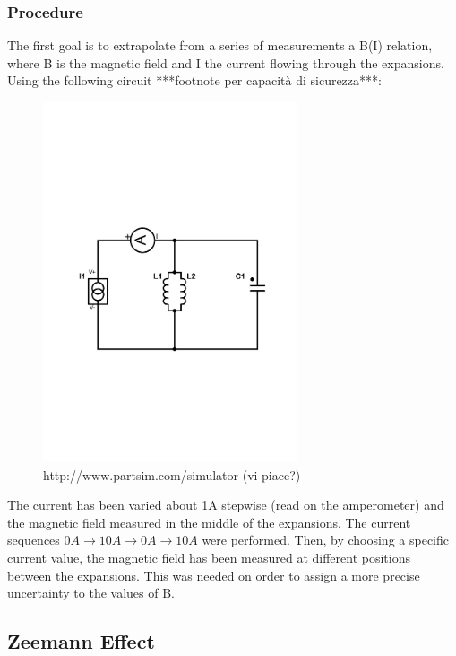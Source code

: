 \documentclass[a4paper,12pt,abstracton]{scrartcl}
\begin{document}
\subsubsection{Procedure}
The first goal is to extrapolate from a series of measurements a B(I) relation, where B is the magnetic field and I the current flowing through the expansions. 
Using the following circuit ***footnote per capacità di sicurezza***:
\begin{figure}[H]
\begin{center}
\includegraphics[trim=3cm 8cm 2.5cm 10cm,clip,width=7.5cm,keepaspectratio]{circuito1.pdf} 
\caption{http://www.partsim.com/simulator (vi piace?)}
\end{center} 
\end{figure}
The current has been varied about 1A stepwise (read on the amperometer) and the magnetic field measured in the middle of the expansions. The current sequences $0A \longrightarrow 10A \longrightarrow 0A \longrightarrow 10A$ were performed.
Then, by choosing a specific current value, the magnetic field has been measured at different positions between the expansions. This was needed on order to assign a more precise uncertainty to the values of B.
\subsection{Zeemann Effect}
\end{document}
